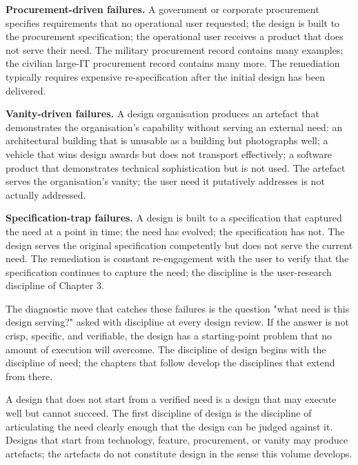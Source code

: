 \textbf{Procurement-driven failures.} A government or corporate procurement specifies requirements that no operational user requested; the design is built to the procurement specification; the operational user receives a product that does not serve their need. The military procurement record contains many examples; the civilian large-IT procurement record contains many more. The remediation typically requires expensive re-specification after the initial design has been delivered.

\textbf{Vanity-driven failures.} A design organisation produces an artefact that demonstrates the organisation's capability without serving an external need: an architectural building that is unusable as a building but photographs well; a vehicle that wins design awards but does not transport effectively; a software product that demonstrates technical sophistication but is not used. The artefact serves the organisation's vanity; the user need it putatively addresses is not actually addressed.

\textbf{Specification-trap failures.} A design is built to a specification that captured the need at a point in time; the need has evolved; the specification has not. The design serves the original specification competently but does not serve the current need. The remediation is constant re-engagement with the user to verify that the specification continues to capture the need; the discipline is the user-research discipline of Chapter 3.

The diagnostic move that catches these failures is the question "what need is this design serving?" asked with discipline at every design review. If the answer is not crisp, specific, and verifiable, the design has a starting-point problem that no amount of execution will overcome. The discipline of design begins with the discipline of need; the chapters that follow develop the disciplines that extend from there.

\begin{principle}
A design that does not start from a verified need is a design that may execute well but cannot succeed. The first discipline of design is the discipline of articulating the need clearly enough that the design can be judged against it. Designs that start from technology, feature, procurement, or vanity may produce artefacts; the artefacts do not constitute design in the sense this volume develops.
\end{principle}

